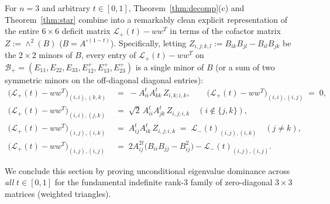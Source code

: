 \documentclass[11pt,a4paper]{article}
\theoremstyle{plain}
\theoremstyle{definition}
\theoremstyle{remark}
\begin{document}
For $n = 3$ and arbitrary $t \in [0,1]$, Theorem~\ref{thm:decomp}(c) and Theorem~\ref{thm:star} combine into a remarkably clean explicit representation of the entire $6 \times 6$ deficit matrix $\mathcal{L}_+(t) - w w^T$ in terms of the cofactor matrix $Z := \wedge^2(B)$ ($B = A^{\circ(1-t)}$). Specifically, letting $Z_{i,j;k,l} := B_{ik}B_{jl} - B_{il}B_{jk}$ be the $2 \times 2$ minors of $B$, every entry of $\mathcal{L}_+(t) - w w^T$ on $\mathcal{B}_+ = (E_{11}, E_{22}, E_{33}, E_{12}^+, E_{13}^+, E_{23}^+)$ is a single minor of $B$ (or a sum of two symmetric minors on the off-diagonal diagonal entries):
\begin{align}
  \big(\mathcal{L}_+(t) - w w^T\big)_{(i,i),(k,k)} &\;=\; -A_{ii}^t A_{kk}^t\, Z_{i,k;i,k}, \qquad
  \big(\mathcal{L}_+(t) - w w^T\big)_{(i,i),(i,j)} \;=\; 0, \label{eq:cofactor_6x6_1}\\
  \big(\mathcal{L}_+(t) - w w^T\big)_{(i,i),(j,k)} &\;=\; \sqrt{2}\, A_{ii}^t A_{jk}^t\, Z_{i,j;i,k} \quad (i \notin \{j,k\}), \label{eq:cofactor_6x6_2}\\
  \big(\mathcal{L}_+(t) - w w^T\big)_{(i,j),(i,k)} &\;=\; A_{ij}^t A_{ik}^t\, Z_{i,j;i,k} \;=\; \mathcal{L}_-(t)_{(i,j),(i,k)} \quad (j \ne k), \label{eq:cofactor_6x6_3}\\
  \big(\mathcal{L}_+(t) - w w^T\big)_{(i,j),(i,j)} &\;=\; 2 A_{ij}^{2t}\big(B_{ii}B_{jj} - B_{ij}^2\big) - \mathcal{L}_-(t)_{(i,j),(i,j)}. \label{eq:cofactor_6x6_4}
\end{align}

We conclude this section by proving unconditional eigenvalue dominance across \emph{all} $t \in [0,1]$ for the fundamental indefinite rank-$3$ family of zero-diagonal $3 \times 3$ matrices (weighted triangles).
\end{document}
